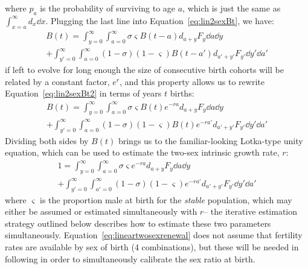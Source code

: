 where $p_a$ is the probability of surviving to age $a$, which is just the same
as $\int_{x=a}^\infty d_x \dd x$. Plugging the last line into
Equation~\eqref{eq:lin2sexBt}, we have:
\begin{equation}
\begin{split}
\label{eq:lin2sexBt2}
B(t) = \int_{y=0}^\infty \int_{a=0}^\infty \sigma \varsigma B(t-a)d_{a+y} 
F_y \dd a \dd y \\+ \int_{y'=0}^\infty \int_{a=0}^\infty (1-\sigma)
(1-\varsigma) B(t-a')d_{a'+y'} F_{y'} \dd y' \dd a'
\end{split}
\end{equation}
if left to evolve for long enough the size of consecutive birth cohorts will be
related by a constant factor, $e^r$, and this property allows us to rewrite
Equation~\eqref{eq:lin2sexBt2} in terms of years $t$ births:
\begin{equation}
\begin{split}
\label{eq:lin2sexBt3}
B(t) = \int_{y=0}^\infty \int_{a=0}^\infty \sigma \varsigma B(t)e^{-ra}d_{a+y} 
F_y \dd a \dd y \\+ \int_{y'=0}^\infty \int_{a=0}^\infty (1-\sigma)
(1-\varsigma) B(t)e^{-ra'}d_{a'+y'} F_{y'} \dd y' \dd a'
\end{split}
\end{equation} 
Dividing both sides by $B(t)$ brings us to the familiar-looking
Lotka-type unity equation, which can be used to estimate the two-sex intrinsic
growth rate, $r$:
\begin{equation}
\begin{split}
\label{eq:lineartwosexrenewal}
1 = \int_{y=0}^\infty \int_{a=0}^\infty \sigma \varsigma e^{-ra}d_{a+y} 
F_y \dd a \dd y \\+ \int_{y'=0}^\infty \int_{a'=0}^\infty (1-\sigma)
(1-\varsigma) e^{-ra'}d_{a'+y'} F_{y'} \dd y' \dd a'
\end{split}
\end{equation} 
where $\varsigma$ is the proportion male at birth for the \textit{stable}
population, which may either be assumed or estimated simultaneously with $r$-- the 
iterative estimation strategy outlined below describes how to estimate these two
parameters simultaneously. Equation~\eqref{eq:lineartwosexrenewal} does 
not assume that fertility rates are
available by sex of birth (4 combinations), but these will be needed in
following in order to simultaneously calibrate the sex ratio at birth.

